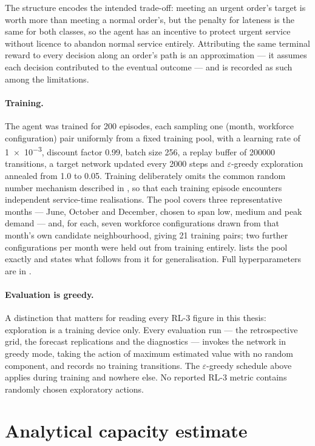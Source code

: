The structure encodes the intended trade-off: meeting an urgent order's target is worth more
than meeting a normal order's, but the penalty for lateness is the same for both classes, so
the agent has an incentive to protect urgent service without licence to abandon normal service
entirely. Attributing the same terminal reward to every decision along an order's path is an
approximation --- it assumes each decision contributed to the eventual outcome --- and is
recorded as such among the limitations.

\paragraph{Training.} The agent was trained for 200 episodes, each sampling one
(month, workforce configuration) pair uniformly from a fixed training pool, with a learning rate
of \num{1e-3}, discount factor \num{0.99}, batch size \num{256}, a replay buffer of \num{200000}
transitions, a target network updated every \num{2000} steps and \(\varepsilon\)-greedy
exploration annealed from \num{1.0} to \num{0.05}. Training deliberately omits the common random
number mechanism described in , so that each training episode encounters
independent service-time realisations. The pool covers three representative months --- June,
October and December, chosen to span low, medium and peak demand --- and, for each, seven
workforce configurations drawn from that month's own candidate neighbourhood, giving 21 training
pairs; two further configurations per month were held out from training entirely.
 lists the pool exactly and states what follows from it for
generalisation. Full hyperparameters are in .

\paragraph{Evaluation is greedy.} A distinction that matters for reading every RL-3 figure in
this thesis: exploration is a training device only. Every evaluation run --- the retrospective
grid, the forecast replications and the diagnostics --- invokes the network in greedy mode,
taking the action of maximum estimated value with no random component, and records no training
transitions. The \(\varepsilon\)-greedy schedule above applies during training and nowhere else.
No reported RL-3 metric contains randomly chosen exploratory actions.

\section{Analytical capacity estimate}
\label{sec:capacity-estimate}

